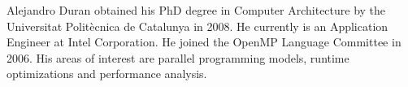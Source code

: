 \begin{IEEEbiography}{Alejandro Duran}
obtained his PhD degree in Computer Architecture by the
Universitat Polit\`ecnica de Catalunya in 2008. He currently is an Application Engineer at Intel Corporation.
He joined the OpenMP Language Committee in 2006. His areas of interest
are parallel programming models, runtime optimizations and performance analysis.
\end{IEEEbiography}

